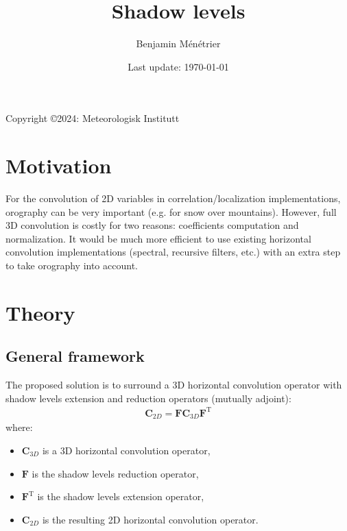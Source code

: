\documentclass[12pt]{scrartcl}
\begin{document}
\title{Shadow levels}
\author{Benjamin Ménétrier}
\date{Last update: \today}

\thispagestyle{empty}

\maketitle
\begin{center}
Copyright \copyright 2024: Meteorologisk Institutt
\end{center}

\tableofcontents

\section{Motivation}
For the convolution of 2D variables in correlation/localization implementations, orography can be very important (e.g. for snow over mountains). However, full 3D convolution is costly for two reasons: coefficients computation and normalization. It would be much more efficient to use existing horizontal convolution implementations (spectral, recursive filters, etc.) with an extra step to take orography into account.

\section{Theory}

\subsection{General framework}
The proposed solution is to surround a 3D horizontal convolution operator with shadow levels extension and reduction operators (mutually adjoint):
\begin{align}
\mathbf{C}_{2D} = \mathbf{F} \mathbf{C}_{3D} \mathbf{F}^\text{T}
\end{align}
where:
\begin{itemize}
\item $\mathbf{C}_{3D}$ is a 3D horizontal convolution operator,
\item $\mathbf{F}$ is the shadow levels reduction operator,
\item $\mathbf{F}^\text{T}$ is the shadow levels extension operator,
\item $\mathbf{C}_{2D}$ is the resulting 2D horizontal convolution operator.
\end{itemize}
\end{document}
